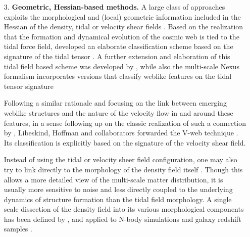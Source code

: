 \begin{itemize}
\item[3.] {\bf Geometric, Hessian-based methods.} A large class of approaches exploits the morphological and (local) geometric  information included in the Hessian of the density, tidal or velocity shear fields
\citep[e.g.][]{Aragon-Calvo2007,Hahn2007,Forero-Romero2009a,Bond2010a,Cautun2013}. Based on the realization that the formation and 
dynamical evolution of the cosmic web is tied to the tidal force field, \cite{Hahn2007} 
developed an elaborate classification scheme based on the signature of the tidal tensor \citep[also see][]{Hahn2007b}. 
A further extension and elaboration of this tidal field based scheme was developed by \cite{Forero-Romero2009a}, while also the 
multi-scale Nexus formalism incorporates versions that classify weblike features on the tidal tensor signature \citep[][see below]{Cautun2013}

Following a similar rationale and focusing on the link between emerging weblike structures and the nature of the 
velocity flow in and around these features, in a sense following up on the classic realization of such a connection by \cite{Zeldovich1970}, 
Libeskind, Hoffman and collaborators forwarded the V-web technique \citep{Hoffman2012a, Forero-Romero2009a, Libeskind2013}. Its classification is explicitly based on the 
signature of the velocity shear field. 

Instead of using the tidal or velocity sheer field configuration, one may also try to link directly to the morphology of the density field itself 
\citep{Aragon-Calvo2007,Bond2010a,Cautun2013}. Though this allows a more detailed view of the  multi-scale matter distribution, it 
is usually more sensitive to noise and less directly coupled to the underlying dynamics of structure formation than the tidal field morphology. 
A single scale dissection of the density field into its various morphological components has been defined by \cite{Bond2010a}, and applied to N-body 
simulations and galaxy redshift samples \citep[also see][]{Bond2010a,Bond2010b,Choi2010}. 


\end{itemize}
